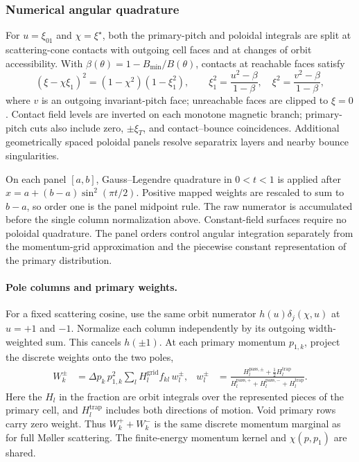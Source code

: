 \documentclass[11pt,a4paper]{article}
\newcommand{\sub}[1]{\ensuremath{_{\text{#1}}}}
\begin{document}
\subsubsection{Numerical angular quadrature}
For $u=\xi_{01}$ and $\chi=\xi^\star$, both the primary-pitch and poloidal
integrals are split at scattering-cone contacts with outgoing cell faces and
at changes of orbit accessibility. With $\beta(\theta)=1-B\sub{min}/B(\theta)$,
contacts at reachable faces satisfy
\begin{equation}
 (\xi-\chi\xi_1)^2=(1-\chi^2)(1-\xi_1^2),\qquad
 \xi_1^2=\frac{u^2-\beta}{1-\beta},\quad
 \xi^2=\frac{v^2-\beta}{1-\beta},
\end{equation}
where $v$ is an outgoing invariant-pitch face; unreachable faces are clipped
to $\xi=0$. Contact field levels are inverted
on each monotone magnetic branch; primary-pitch cuts also include zero,
$\pm\xi_T$, and contact--bounce coincidences. Additional geometrically spaced
poloidal panels resolve separatrix layers and nearby bounce singularities.

On each panel $[a,b]$, Gauss--Legendre quadrature in $0<t<1$ is applied after
$x=a+(b-a)\sin^2(\pi t/2)$. Positive mapped weights are rescaled to sum to
$b-a$, so order one is the panel midpoint rule. The raw numerator is accumulated
before the single column normalization above. Constant-field surfaces require
no poloidal quadrature. The panel orders control angular integration separately
from the momentum-grid approximation and the piecewise constant representation
of the primary distribution.


\paragraph{Pole columns and primary weights.}
For a fixed scattering cosine, use the same orbit numerator
$h(u)\delta_j(\chi,u)$ at $u=+1$ and $-1$. Normalize each column
independently by its outgoing width-weighted sum. This cancels $h(\pm1)$.
At each primary momentum $p_{1,k}$, project the discrete weights onto
the two poles,
\begin{align}
 W_k^\pm &= \Delta p_k\,p_{1,k}^2
    \sum_l H_l^{\mathrm{grid}} f_{kl}\,w_l^\pm,
 &
 w_l^\pm &=
 \frac{H_l^{\mathrm{pass},\pm}+\tfrac12 H_l^{\mathrm{trap}}}
 {H_l^{\mathrm{pass},+}+H_l^{\mathrm{pass},-}+H_l^{\mathrm{trap}}}.
\end{align}
Here the $H_l$ in the fraction are orbit integrals over the represented
pieces of the primary cell, and $H_l^{\mathrm{trap}}$ includes both
directions of motion. Void primary rows carry zero weight. Thus
$W_k^++W_k^-$ is the same discrete momentum marginal as for full M\o ller
scattering. The finite-energy momentum kernel and $\chi(p,p_1)$ are shared.
\end{document}
